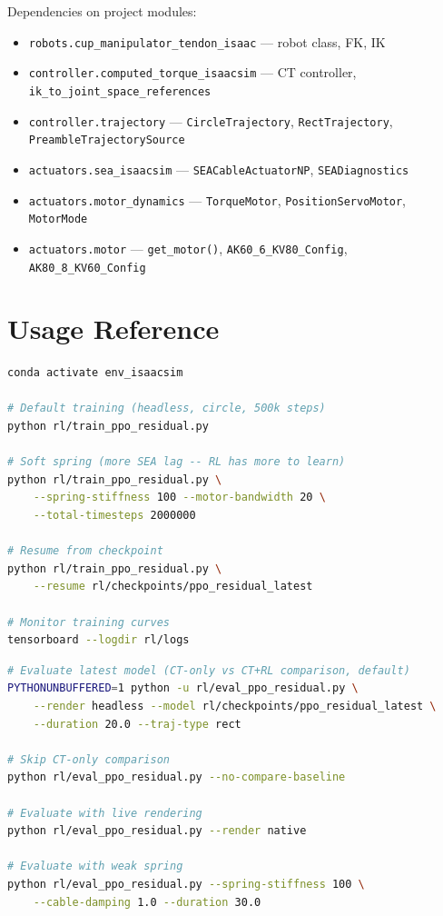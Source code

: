 \documentclass[11pt, a4paper]{article}
\begin{document}
Dependencies on project modules:
\begin{itemize}[nosep]
  \item \texttt{robots.cup\_manipulator\_tendon\_isaac} --- robot class, FK, IK
  \item \texttt{controller.computed\_torque\_isaacsim} --- CT controller,
        \texttt{ik\_to\_joint\_space\_references}
  \item \texttt{controller.trajectory} --- \texttt{CircleTrajectory},
        \texttt{RectTrajectory}, \texttt{PreambleTrajectorySource}
  \item \texttt{actuators.sea\_isaacsim} --- \texttt{SEACableActuatorNP},
        \texttt{SEADiagnostics}
  \item \texttt{actuators.motor\_dynamics} --- \texttt{TorqueMotor},
        \texttt{PositionServoMotor}, \texttt{MotorMode}
  \item \texttt{actuators.motor} --- \texttt{get\_motor()},
        \texttt{AK60\_6\_KV80\_Config}, \texttt{AK80\_8\_KV60\_Config}
\end{itemize}


\section{Usage Reference}

\begin{lstlisting}[language=bash, caption={Training commands}]
conda activate env_isaacsim

# Default training (headless, circle, 500k steps)
python rl/train_ppo_residual.py

# Soft spring (more SEA lag -- RL has more to learn)
python rl/train_ppo_residual.py \
    --spring-stiffness 100 --motor-bandwidth 20 \
    --total-timesteps 2000000

# Resume from checkpoint
python rl/train_ppo_residual.py \
    --resume rl/checkpoints/ppo_residual_latest

# Monitor training curves
tensorboard --logdir rl/logs
\end{lstlisting}

\begin{lstlisting}[language=bash, caption={Evaluation commands}]
# Evaluate latest model (CT-only vs CT+RL comparison, default)
PYTHONUNBUFFERED=1 python -u rl/eval_ppo_residual.py \
    --render headless --model rl/checkpoints/ppo_residual_latest \
    --duration 20.0 --traj-type rect

# Skip CT-only comparison
python rl/eval_ppo_residual.py --no-compare-baseline

# Evaluate with live rendering
python rl/eval_ppo_residual.py --render native

# Evaluate with weak spring
python rl/eval_ppo_residual.py --spring-stiffness 100 \
    --cable-damping 1.0 --duration 30.0
\end{lstlisting}
\end{document}
